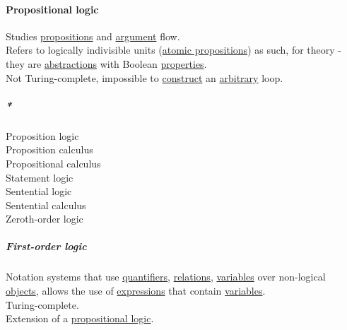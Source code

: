 \documentclass[11pt]{article}
\begin{document}
\paragraph{\label{org7549492}Propositional logic}
\label{sec:org2f6d225}
Studies \hyperref[org6498988]{propositions} and \hyperref[orga6b7e97]{argument} flow.\\

Refers to logically indivisible units (\hyperref[org7521680]{atomic propositions}) as such, for theory - they are \hyperref[orgc16d079]{abstractions} with Boolean \hyperref[org85fb3a1]{properties}.\\

Not Turing-complete, impossible to \hyperref[org3eb9b19]{construct} an \hyperref[orga23d095]{arbitrary} loop.\\

\subparagraph{\emph{*}}
\label{sec:org4766ae2}

\label{org980bef1}Proposition logic\\
\label{orgfc1e85d}Proposition calculus\\
\label{org5136bfa}Propositional calculus\\
\label{org9a84bc2}Statement logic\\
\label{orgf73f775}Sentential logic\\
\label{org12a4fa4}Sentential calculus\\
\label{orgb3c57d2}Zeroth-order logic\\

\subparagraph{\label{orgbfdb58a}First-order logic}
\label{sec:orgee2da1e}
Notation systems that use \hyperref[org56c9794]{quantifiers}, \hyperref[org711476e]{relations}, \hyperref[orge17f54f]{variables} over non-logical \hyperref[org363acc2]{objects}, allows the use of \hyperref[org3731c99]{expressions} that contain \hyperref[orge17f54f]{variables}.\\

Turing-complete.\\

Extension of a \hyperref[org7549492]{propositional logic}.\\
\end{document}
